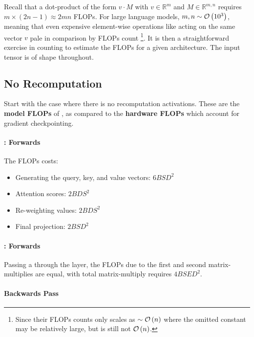\documentclass[11pt]{article}
\begin{document}
Recall that a dot-product of the form $ v \cdot M $  with $ v \in \mathbb{R}^{ m } $ and $ M \in
\mathbb{R} ^{ m, n }$ requires $ m\times \left (2 n-1 \right ) \approx 2mn$ FLOPs.  For large
language models, $ m,n \sim \mathcal{O} \left( 10 ^{ 3 } \right)  $, meaning that even expensive
element-wise operations like  acting on the same vector $ v $ pale in comparison by
FLOPs count \footnote{Since their FLOPs counts only scales as $ \sim \mathcal{O} \left( n\right )  $ where
the omitted constant may be relatively large, but is still not $ \mathcal{O} \left( n \right)  $.}. It is
then a straightforward exercise in counting to estimate the FLOPs for a given architecture. The input tensor
is of shape  throughout.



\subsection{No Recomputation}

Start with the case where there is no recomputation activations.  These are the \textbf{model FLOPs} of
\cite{korthikanti2022reducing}, as compared to the \textbf{hardware FLOPs} which account for gradient
checkpointing.


\paragraph{: Forwards }

The FLOPs costs:
\begin{itemize}
    \item  Generating the query, key, and value vectors: $ 6BSD ^{ 2 } $
    \item Attention scores:  $2BDS ^{ 2 }$
    \item Re-weighting values:  $2BDS ^{ 2 }$
    \item Final projection: $ 2BSD ^{ 2 } $
\end{itemize}

\paragraph{: Forwards}
Passing a  through the  layer, the FLOPs due to the
first and second matrix-multiplies are equal, with total matrix-multiply requires $ 4BSED ^{ 2 } $.

\paragraph{Backwards Pass}
\end{document}
